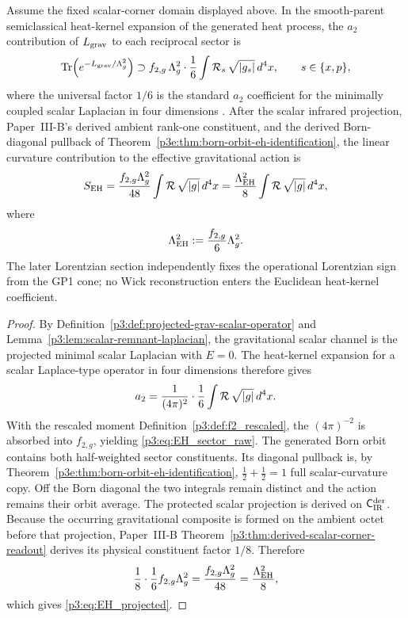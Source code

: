 \documentclass[12pt,a4paper]{article}
\begin{document}
\begin{proposition}
\label{p3:prop:EH_from_a2}
Assume the fixed scalar-corner domain displayed above.  In the smooth-parent
semiclassical heat-kernel expansion of the generated heat process,
the \(a_2\) contribution of \(L_{\rm grav}\) to each reciprocal sector is
\begin{equation}
\operatorname{Tr}\!\left(e^{-L_{\rm grav}/\Lambda_g^2}\right)\supset f_{2,g}\,\Lambda_g^2\cdot
\frac{1}{6}\int \mathcal R_s\,\sqrt{|g_s|}\,d^4x,
\qquad s\in\{x,p\},
\label{p3:eq:EH_sector_raw}
\end{equation}
where the universal factor \(1/6\) is the standard \(a_2\) coefficient for the minimally coupled scalar Laplacian in four dimensions \cite{berline1992heat,ChamseddineConnes1997}.  After the scalar infrared projection, Paper~III-B's derived ambient rank-one constituent, and the derived Born-diagonal pullback of Theorem~\ref{p3e:thm:born-orbit-eh-identification}, the linear curvature contribution to the effective gravitational action is
\begin{equation}
S_{\mathrm{EH}}
=\frac{f_{2,g}\Lambda_g^2}{48}\int \mathcal R\,\sqrt{|g|}\,d^4x
=\frac{\Lambda_{\rm EH}^2}{8}\int \mathcal R\,\sqrt{|g|}\,d^4x,
\label{p3:eq:EH_projected}
\end{equation}
where
\begin{equation}
\Lambda_{\rm EH}^2:=\frac{f_{2,g}}{6}\Lambda_g^2.
\label{p3:eq:Lambda_EH_def}
\end{equation}
The later Lorentzian section independently fixes the operational Lorentzian
sign from the GP1 cone; no Wick reconstruction enters the Euclidean
heat-kernel coefficient.
\end{proposition}

\begin{proof}
By Definition~\ref{p3:def:projected-grav-scalar-operator} and Lemma~\ref{p3:lem:scalar-remnant-laplacian}, the gravitational scalar channel is the projected minimal scalar Laplacian with \(E=0\).  The heat-kernel expansion for a scalar Laplace-type operator in four dimensions therefore gives
\[
a_2=\frac{1}{(4\pi)^2}\cdot\frac{1}{6}\int \mathcal R\,\sqrt{|g|}\,d^4x .
\]
With the rescaled moment Definition~\ref{p3:def:f2_rescaled}, the
\((4\pi)^{-2}\) is absorbed into \(f_{2,g}\), yielding
\eqref{p3:eq:EH_sector_raw}.  The generated Born orbit contains both
half-weighted sector constituents.  Its diagonal pullback is, by
Theorem~\ref{p3e:thm:born-orbit-eh-identification},
\(\frac12+\frac12=1\) full scalar-curvature copy.  Off the Born diagonal the
two integrals remain distinct and the action remains their orbit average.
The protected scalar projection is derived on
\(\mathsf C_{\rm IR}^{\rm der}\).  Because the occurring
gravitational composite is formed on the ambient octet before that projection,
Paper~III-B Theorem~\ref{p3:thm:derived-scalar-corner-readout} derives its
physical constituent factor \(1/8\).  Therefore
\[
\frac{1}{8}\cdot\frac{1}{6}f_{2,g}\Lambda_g^2=\frac{f_{2,g}\Lambda_g^2}{48}
=\frac{\Lambda_{\rm EH}^2}{8},
\]
which gives \eqref{p3:eq:EH_projected}.
\end{proof}
\end{document}
